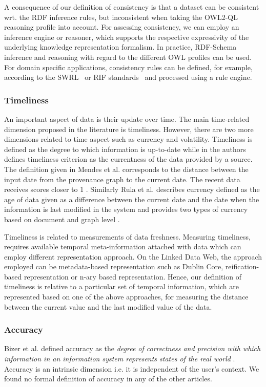 A consequence of our definition of consistency is that a dataset can be consistent wrt. the RDF inference rules, but inconsistent when taking the OWL2-QL reasoning profile into account.
For assessing consistency, we can employ an inference engine or reasoner, which supports the respective expressivity of the underlying knowledge representation formalism.
In practice, RDF-Schema inference and reasoning with regard to the different OWL profiles can be used.
For domain specific applications, consistency rules can be defined, for example, according to the SWRL~\cite{Horrocks} or RIF standards~\cite{Kifer} and processed using a rule engine.

\subsubsection{Timeliness}
An important aspect of data is their update over time. The main time-related dimension proposed in the literature is timeliness. However, there are two more dimensions related to time aspect such as currency and volatility.
Timeliness is defined as the degree to which information is up-to-date \cite{Bizerthesis} while in \cite{Flemming} the authors defines timeliness criterion as the currentness of the data provided by a source. The definition given in Mendes et al. corresponds to the distance between the input date from the provenance graph to the current date. The recent data receives scores closer to 1 \cite{Mendes}. Similarly Rula et al. describes currency defined as the age of data given as a difference between the current date and the date when the information is last modified in the system and provides two types of currency based on document and graph level \cite{Rula2012}.
\begin{definition}[Timeliness]
Timeliness is related to measurements of data freshness. Measuring timeliness, requires available temporal meta-information attached with data which can employ different representation approach. On the Linked Data Web, the approach employed can be metadata-based representation such as Dublin Core,  reification-based representation or n-ary based representation. Hence, our definition of timeliness is relative to a particular set of temporal information, which are represented based on one of the above approaches, for measuring the distance between the current value and the last modified value of the data. 
\end{definition}

\subsubsection{Accuracy}
Bizer et al. defined accuracy as the \emph{degree of correctness and precision with which information in an information system represents states of the real world} \cite{Bizerthesis}. 
Accuracy is an intrinsic dimension i.e. it is independent of the user's context. 
We found no formal definition of accuracy in any of the other articles.


